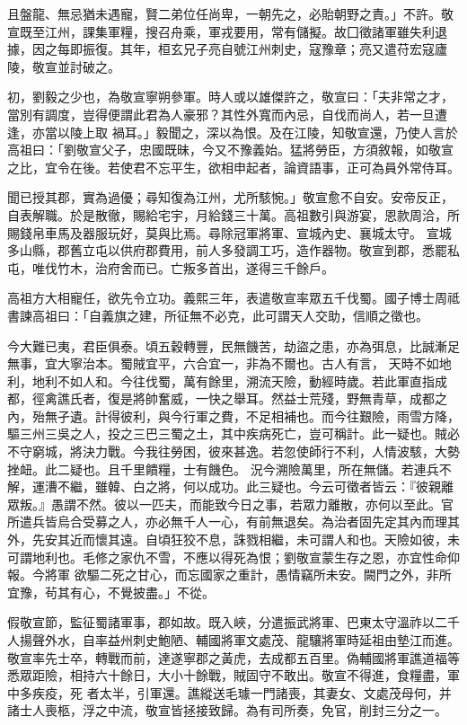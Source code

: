 \begin{pinyinscope}
 且盤龍、無忌猶未遇寵，賢二弟位任尚卑，一朝先之，必貽朝野之責。」不許。敬宣既至江州，課集軍糧，搜召舟乘，軍戎要用，常有儲擬。故囗徵諸軍雖失利退據，因之每即振復。其年，桓玄兄子亮自號江州刺史，寇豫章；亮又遣苻宏寇廬陵，敬宣並討破之。



 初，劉毅之少也，為敬宣寧朔參軍。時人或以雄傑許之，敬宣曰：「夫非常之才，當別有調度，豈得便謂此君為人豪邪？其性外寬而內忌，自伐而尚人，若一旦遭逢，亦當以陵上取
 禍耳。」毅聞之，深以為恨。及在江陵，知敬宣還，乃使人言於高祖曰：「劉敬宣父子，忠國既昧，今又不豫義始。猛將勞臣，方須敘報，如敬宣之比，宜令在後。若使君不忘平生，欲相申起者，論資語事，正可為員外常侍耳。



 聞已授其郡，實為過優；尋知復為江州，尤所駭惋。」敬宣愈不自安。安帝反正，自表解職。於是散徹，賜給宅宇，月給錢三十萬。高祖數引與游宴，恩款周洽，所賜錢帛車馬及器服玩好，莫與比焉。尋除冠軍將軍、宣城內史、襄城太守。
 宣城多山縣，郡舊立屯以供府郡費用，前人多發調工巧，造作器物。敬宣到郡，悉罷私屯，唯伐竹木，治府舍而已。亡叛多首出，遂得三千餘戶。



 高祖方大相寵任，欲先令立功。義熙三年，表遣敬宣率眾五千伐蜀。國子博士周祗書諫高祖曰：「自義旗之建，所征無不必克，此可謂天人交助，信順之徵也。



 今大難已夷，君臣俱泰。頃五穀轉豐，民無饑苦，劫盜之患，亦為弭息，比誠漸足無事，宜大寧治本。蜀賊宜平，六合宜一，非為不爾也。古人有言，
 天時不如地利，地利不如人和。今往伐蜀，萬有餘里，溯流天險，動經時歲。若此軍直指成都，徑禽譙氏者，復是將帥奮威，一快之舉耳。然益士荒殘，野無青草，成都之內，殆無孑遺。計得彼利，與今行軍之費，不足相補也。而今往艱險，雨雪方降，驅三州三吳之人，投之三巴三蜀之土，其中疾病死亡，豈可稱計。此一疑也。賊必不守窮城，將決力戰。今我往勞困，彼來甚逸。若忽使師行不利，人情波駭，大勢挫衄。此二疑也。且千里饋糧，士有饑色。
 況今溯險萬里，所在無儲。若連兵不解，運漕不繼，雖韓、白之將，何以成功。此三疑也。今云可徵者皆云：『彼親離眾叛。』愚謂不然。彼以一匹夫，而能致今日之事，若眾力離散，亦何以至此。官所遣兵皆烏合受募之人，亦必無千人一心，有前無退矣。為治者固先定其內而理其外，先安其近而懷其遠。自頃狂狡不息，誅戮相繼，未可謂人和也。天險如彼，未可謂地利也。毛修之家仇不雪，不應以得死為恨；劉敬宣蒙生存之恩，亦宜性命仰報。今將軍
 欲驅二死之甘心，而忘國家之重計，愚情竊所未安。闕門之外，非所宜豫，茍其有心，不覺披盡。」不從。



 假敬宣節，監征蜀諸軍事，郡如故。既入峽，分遣振武將軍、巴東太守溫祚以二千人揚聲外水，自率益州刺史鮑陋、輔國將軍文處茂、龍驤將軍時延祖由墊江而進。敬宣率先士卒，轉戰而前，達遂寧郡之黃虎，去成都五百里。偽輔國將軍譙道福等悉眾距險，相持六十餘日，大小十餘戰，賊固守不敢出。敬宣不得進，食糧盡，軍中多疾疫，死
 者太半，引軍還。譙縱送毛璩一門諸喪，其妻女、文處茂母何，并諸士人喪柩，浮之中流，敬宣皆拯接致歸。為有司所奏，免官，削封三分之一。




\end{pinyinscope}
